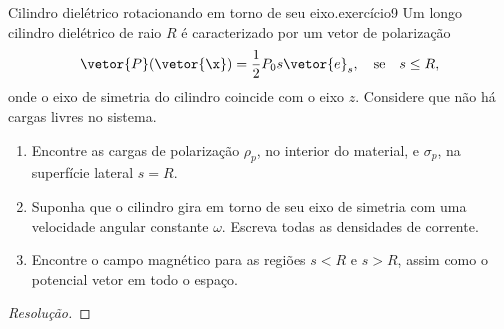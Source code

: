 \begin{exercício}{Cilindro dielétrico rotacionando em torno de seu eixo.}{exercício9}
    Um longo cilindro dielétrico de raio \(R\) é caracterizado por um vetor de polarização
    \begin{equation*}
        \vetor{P}(\vetor{\x}) = \frac12P_0 s\vetor{e}_s,\quad\text{se}\quad s \leq R,
    \end{equation*}
    onde o eixo de simetria do cilindro coincide com o eixo \(z\). Considere que não há cargas livres no sistema.
    \begin{enumerate}[label=(\alph*)]
        \item Encontre as cargas de polarização \(\rho_p\), no interior do material, e \(\sigma_p\), na superfície lateral \(s = R\).
        \item Suponha que o cilindro gira em torno de seu eixo de simetria com uma velocidade angular constante \(\omega\). Escreva todas as densidades de corrente.
        \item Encontre o campo magnético para as regiões \(s < R\) e \(s > R\), assim como o potencial vetor em todo o espaço.
    \end{enumerate}
\end{exercício}
\begin{proof}[Resolução]

\end{proof}
